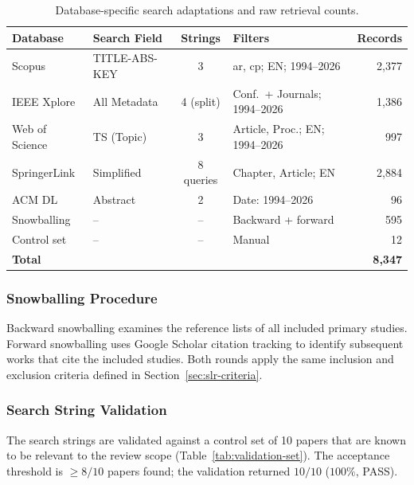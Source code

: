 \begin{table}[htbp]
\centering
\caption{Database-specific search adaptations and raw retrieval counts.}
\label{tab:db-adaptations}
\small
\setlength{\tabcolsep}{4pt}
\begin{tabular}{p{2.6cm} p{2.6cm} c p{5.0cm} r}
\toprule
\textbf{Database} & \textbf{Search Field} & \textbf{Strings} & \textbf{Filters} & \textbf{Records} \\
\midrule
Scopus         & TITLE-ABS-KEY & 3         & ar, cp; EN; 1994--2026                 & 2{,}377 \\
IEEE Xplore    & All Metadata  & 4 (split) & Conf.\ + Journals; 1994--2026          & 1{,}386 \\
Web of Science & TS (Topic)    & 3         & Article, Proc.; EN; 1994--2026         & 997 \\
SpringerLink   & Simplified    & 8 queries & Chapter, Article; EN                   & 2{,}884 \\
ACM DL         & Abstract      & 2         & Date: 1994--2026                       & 96 \\
Snowballing    & --            & --        & Backward + forward                     & 595 \\
Control set    & --            & --        & Manual                                 & 12 \\
\midrule
\textbf{Total} &  &  &  & \textbf{8{,}347} \\
\bottomrule
\end{tabular}
\end{table}

\subsubsection{Snowballing Procedure}

Backward snowballing examines the reference lists of all included primary
studies. Forward snowballing uses Google Scholar citation tracking to identify
subsequent works that cite the included studies. Both rounds apply the same
inclusion and exclusion criteria defined in Section~\ref{sec:slr-criteria}.

\subsubsection{Search String Validation}

The search strings are validated against a control set of 10 papers that are
known to be relevant to the review scope
(Table~\ref{tab:validation-set}). The acceptance threshold is $\geq 8/10$
papers found; the validation returned $10/10$ ($100\%$, PASS).

